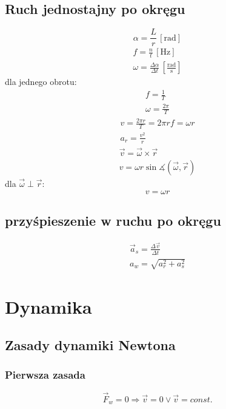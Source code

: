 \documentclass{report}
\numberwithin{equation}{chapter}
\newcommand{\unit}[1]{\,\left[\mathrm{#1}\right]}
\begin{document}
    \section{Ruch jednostajny po okręgu}
      \begin{equation}
        \alpha = \frac Lr \unit{rad}
      \end{equation}
      \begin{gather}
        f = \frac nt \unit{Hz}\\
        \omega = \frac{\Delta\alpha}{\Delta t} \unit{\frac{rad}{s}}
      \end{gather}
      dla jednego obrotu:
      \begin{gather}
        f = \frac 1T\\
        \omega = \frac{2\pi}{T}
      \end{gather}
      \begin{gather}
        v = \frac{2\pi r}{T} = 2\pi rf = \omega r\\
        a_r = \frac{v^2}{r}
      \end{gather}
      \begin{gather}
        \vec v = \vec\omega \times \vec r\\
        v = \omega r\sin\measuredangle(\vec\omega, \vec r)
      \end{gather}
      dla $\vec\omega \perp \vec r$:
      \begin{equation}
        v = \omega r
      \end{equation}
    \section{przyśpieszenie w ruchu po okręgu}
      \begin{gather}
        \vec a_s = \frac{\Delta\vec v}{\Delta t}\\
        a_w = \sqrt{a_r^2 + a_s^2}
      \end{gather}

  \newpage
  \chapter{Dynamika}
    \section{Zasady dynamiki Newtona}
      \subsection{Pierwsza zasada}
        \begin{equation}
          \vec F_w = 0 \Rightarrow \vec v = 0 \lor \vec v = const.
        \end{equation}
\end{document}
